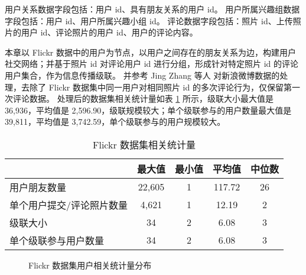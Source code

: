 用户关系数据字段包括：用户 id、具有朋友关系的用户 id。
用户所属兴趣组数据字段包括：用户 id、用户所属兴趣小组 id。
评论数据字段包括：照片 id、上传照片的用户 id、评论照片的用户 id、用户的评论内容。


本章以 Flickr 数据中的用户为节点，以用户之间存在的朋友关系为边，构建用户社交网络；并基于照片 id 对评论用户 id 进行分组，形成针对特定照片 id 的评论用户集合，作为信息传播级联。
并参考 Jing Zhang 等人  \cite{zhang2013social} 对新浪微博数据的处理，去除了 Flickr 数据集中同一用户对相同照片 id 的多次评论行为，仅保留第一次评论数据。
处理后的数据集相关统计量如表 \ref{tabana:flickr} 所示，级联大小最大值是 36,936，平均值是 2,596.90，级联规模较大；单个级联参与的用户数量最大值是 39,811，平均值是 3,742.59，单个级联参与的用户规模较大。 

\begin{table}[]
	\begin{center}
		\caption{Flickr 数据集相关统计量}
		\begin{tabular}{lcccc}
			\toprule[1.5pt]
			 & 最大值 & 最小值 & 平均值 & 中位数\\
			\midrule[1pt]
			用户朋友数量 & 22,605 & 1 & 117.72 & 26 \\
			单个用户提交/评论照片数量 & 4,621 & 1 & 12.19 & 2 \\
			级联大小 & 34 & 2 & 6.08 & 3 \\
			单个级联参与用户数量 & 34 & 2 & 6.08 & 3 \\
			\bottomrule[1.5pt]
		\end{tabular}
		\label{tabana:flickr}
		\vspace{\baselineskip}
	\end{center}
\end{table}


\begin{figure}
	\centering

    \caption{Flickr 数据集用户相关统计量分布}
    \label{figana:flickr}
\end{figure}


